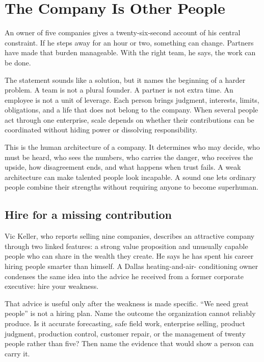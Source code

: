 \chapter{The Company Is Other People}

An owner of five companies gives a twenty-six-second account of his central
constraint. If he steps away for an hour or two, something can change. Partners
have made that burden manageable. With the right team, he says, the work can be
done.

The statement sounds like a solution, but it names the beginning of a harder
problem. A team is not a plural founder. A partner is not extra time. An
employee is not a unit of leverage. Each person brings judgment, interests,
limits, obligations, and a life that does not belong to the company. When
several people act through one enterprise, scale depends on whether their
contributions can be coordinated without hiding power or dissolving
responsibility.

This is the human architecture of a company. It determines who may decide, who
must be heard, who sees the numbers, who carries the danger, who receives the
upside, how disagreement ends, and what happens when trust fails. A weak
architecture can make talented people look incapable. A sound one lets
ordinary people combine their strengths without requiring anyone to become
superhuman.

\section{Hire for a missing contribution}

Vic Keller, who reports selling nine companies, describes an attractive
company through two linked features: a strong value proposition and unusually
capable people who can share in the wealth they create. He says he has spent
his career hiring people smarter than himself. A Dallas heating-and-air-
conditioning owner condenses the same idea into the advice he received from a
former corporate executive: hire your weakness.

That advice is useful only after the weakness is made specific. ``We need great
people'' is not a hiring plan. Name the outcome the organization cannot
reliably produce. Is it accurate forecasting, safe field work, enterprise
selling, product judgment, production control, customer repair, or the
management of twenty people rather than five? Then name the evidence that
would show a person can carry it.


